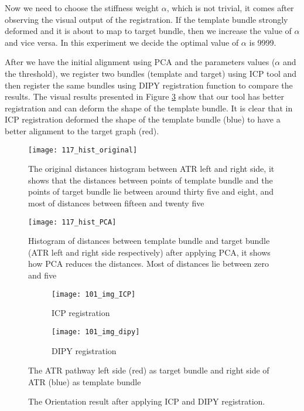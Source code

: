 \documentclass[../structure.tex]{subfiles}
\begin{document}
Now we need to choose the stiffness weight $\alpha$, which is not trivial, it comes after observing the visual output of the registration. If the template bundle strongly deformed and it is about to map to target bundle, then we increase the value of $\alpha$ and vice versa. In this experiment we decide the optimal value of $\alpha$ is 9999.

After we have the initial alignment using PCA and the parameters values ($\alpha$ and the threshold), we register two bundles (template and target) using ICP tool and then register the same bundles using DIPY registration function to compare the results. The visual results presented in Figure \ref{fig:registration} show that our tool has better registration and can deform the shape of the template bundle. It is clear that in ICP registration  deformed the shape of the template bundle (blue) to have a better alignment to the target graph (red).

\begin{figure}[H]
\centering
\texttt{[image: 117\_hist\_original]}
\captionsetup{justification=centering}
\caption{The original distances histogram between ATR left and right side, it shows that the distances between points of template bundle and the points of target bundle lie between around thirty five and eight, and most of distances between fifteen and twenty five}
\label{fig:hist_original}
\end{figure}

\begin{figure}[H]
\centering
\texttt{[image: 117\_hist\_PCA]}
\captionsetup{justification=centering}
\caption{Histogram of distances between template bundle and target bundle (ATR left and right side respectively) after applying PCA, it shows how PCA reduces the distances. Most of distances lie between zero and five}
\label{fig:hist_PCA}
\end{figure}

\begin{figure}[H]
	\centering
	\begin{subfigure}[b]{0.49\textwidth}
	\texttt{[image: 101\_img\_ICP]}
	\caption{ICP registration}
	\end{subfigure}
	\begin{subfigure}[b]{0.49\textwidth}
	\texttt{[image: 101\_img\_dipy]}
	\caption{DIPY registration}
	\end{subfigure}
\caption{The Orientation result after applying ICP and DIPY registration.}%
{The ATR pathway left side (red) as target bundle and right side of ATR (blue) as template bundle}
\label{fig:registration}
\end{figure}
\end{document}
